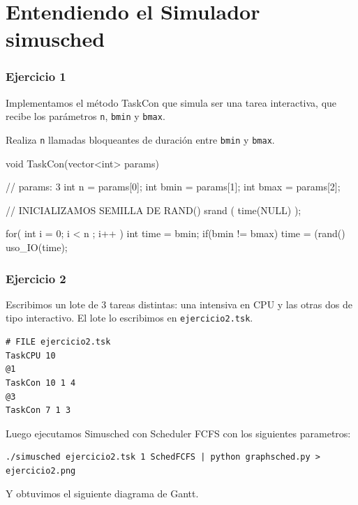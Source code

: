 


\part{Entendiendo el Simulador simusched}

\section{Ejercicio 1}

Implementamos el m\'etodo TaskCon que simula ser una tarea interactiva, que recibe los par\'ametros \verb|n|, \verb|bmin| y \verb|bmax|.

Realiza \verb|n| llamadas bloqueantes de duraci\'on entre \verb|bmin| y \verb|bmax|.

\begin{framed}
\begin{verbatimtab}
void TaskCon(vector<int> params) { // params: 3
	int n = params[0];
	int bmin = params[1];
	int bmax = params[2];
	
	// INICIALIZAMOS SEMILLA DE RAND()
	srand ( time(NULL) );
	
	for( int i = 0; i < n ; i++ ) {
		int time = bmin;
		if(bmin != bmax)
			time = (rand()%
		uso_IO(time);
	}
}
\end{verbatimtab}
\end{framed}

\section{Ejercicio 2}

Escribimos un lote de 3 tareas distintas: una intensiva en CPU y las otras dos de tipo interactivo. 
El lote lo escribimos en \verb|ejercicio2.tsk|.

\begin{framed}
\begin{verbatim}
# FILE ejercicio2.tsk
TaskCPU 10
@1
TaskCon 10 1 4
@3
TaskCon 7 1 3
\end{verbatim}
\end{framed}

Luego ejecutamos Simusched con Scheduler FCFS con los siguientes parametros:

\begin{verbatim}
./simusched ejercicio2.tsk 1 SchedFCFS | python graphsched.py > ejercicio2.png
\end{verbatim}

Y obtuvimos el siguiente diagrama de Gantt.


